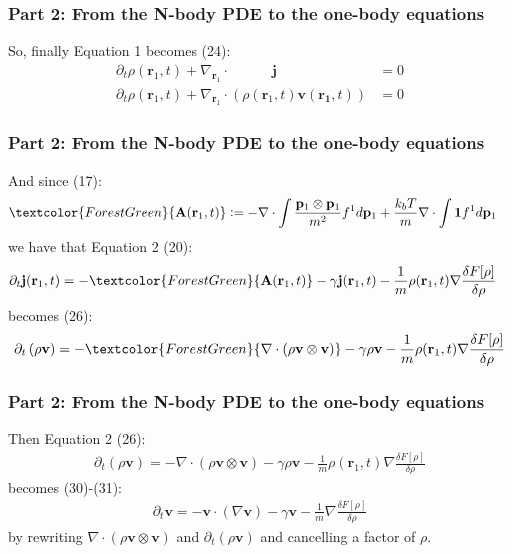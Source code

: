 \documentclass[aspectratio=169,xcolor=dvipsnames]{beamer}
\begin{document}
\begin{frame}
	\frametitle{Part 2: From the N-body PDE to the one-body equations}
	So, finally Equation 1 becomes (24):
	\begin{align*}
	{\partial_t \rho(\mathbf{r}_1,t)} + {\nabla_{\mathbf{r}_1} \cdot\qquad\quad \mathbf{j}} \ \ \quad \qquad &= 0\\
	{\partial_t \rho(\mathbf{r}_1,t)} + \nabla_{\mathbf{r}_1} \cdot \left(\rho(\mathbf{r}_1,t) \mathbf{v}(\mathbf{r_1},t)\right) &= 0
	\end{align*}
	
\end{frame}
\begin{frame}
	\frametitle{Part 2: From the N-body PDE to the one-body equations}
	And since (17):
	\begin{align*}
	\textcolor{ForestGreen}{\mathbf{A}(\mathbf{r}_1,t)}& :=- \nabla \cdot \int \frac{\mathbf{p}_1 \otimes \mathbf{p}_1}{m^2} f^1 d \mathbf{p}_1 + \frac{k_bT}{m} \nabla \cdot \int  \mathbf{1}f^1 d\mathbf{p}_1
	\end{align*}
	we have that Equation 2 (20):
	\begin{align*}
	\partial_t \mathbf{j}(\mathbf{r}_1,t) &= -\textcolor{ForestGreen}{\mathbf{A}(\mathbf{r}_1,t)}  - \gamma \mathbf{j}(\mathbf{r}_1,t)
	- \frac{1}{m} { \rho(\mathbf{r}_1,t)\nabla \frac{\delta F[\rho]}{\delta \rho}}
	\end{align*}
	becomes (26):
	\begin{align*}
	\partial_t \left(\rho \mathbf{v}\right) =  - \textcolor{ForestGreen}{\nabla \cdot \left(\rho \mathbf{v} \otimes \mathbf{v}\right)}- \gamma \rho \mathbf{v} - \frac{1}{m} { \rho(\mathbf{r}_1,t)\nabla \frac{\delta F[\rho]}{\delta \rho}}
	\end{align*}
\end{frame}
\begin{frame}
	\frametitle{Part 2: From the N-body PDE to the one-body equations}
	Then Equation 2 (26):
	\begin{align*}
	\partial_t \left(\rho \mathbf{v}\right) =  - \nabla \cdot \left(\rho \mathbf{v} \otimes \mathbf{v}\right)- \gamma \rho \mathbf{v} - \frac{1}{m} { \rho(\mathbf{r}_1,t)\nabla \frac{\delta F[\rho]}{\delta \rho}}
	\end{align*}
	becomes (30)-(31):
	\begin{align*}
	\partial_t \mathbf{v} =  - \mathbf{v} \cdot\left(\nabla \mathbf{v}\right) - \gamma  \mathbf{v} - \frac{1}{m} { \nabla \frac{\delta F[\rho]}{\delta \rho}}
	\end{align*}
	by rewriting $ \nabla \cdot \left(\rho \mathbf{v} \otimes \mathbf{v}\right)$ and $\partial_t \left(\rho \mathbf{v}\right)$ and cancelling a factor of $\rho$.
\end{frame}
\end{document}
